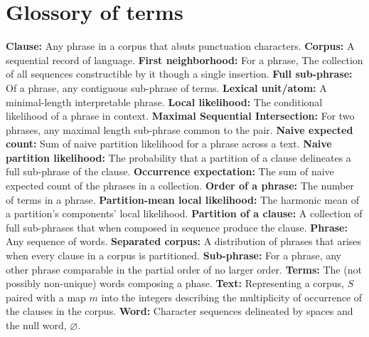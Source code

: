 \section{Glossory of terms}
{\footnotesize
\textbf{Clause:} Any phrase in a corpus that abuts punctuation characters.\newline
\textbf{Corpus:} A sequential record of language.\newline
\textbf{First neighborhood:} For a phrase, The collection of all sequences constructible by it though a single insertion.\newline
\textbf{Full sub-phrase:} Of a phrase, any contiguous sub-phrase of terms.\newline
\textbf{Lexical unit/atom:} A minimal-length interpretable phrase. \newline
\textbf{Local likelihood:} The conditional likelihood of a phrase in context.\newline
\textbf{Maximal Sequential Intersection:} For two phrases, any maximal length sub-phrase common to the pair.\newline
\textbf{Naive expected count:} Sum of naive partition likelihood for a phrase across a text.\newline
\textbf{Naive partition likelihood:} The probability that a partition of a clause delineates a full sub-phrase of the clause.\newline
\textbf{Occurrence expectation:} The sum of naive expected count of the phrases in a collection.\newline
\textbf{Order of a phrase:} The number of terms in a phrase.\newline
\textbf{Partition-mean local likelihood:} The harmonic mean of a partition's components' local likelihood.\newline
\textbf{Partition of a clause:} A collection of full sub-phrases that when composed in sequence produce the clause.\newline
\textbf{Phrase:} Any sequence of words.\newline
\textbf{Separated corpus:} A distribution of phrases that arises when every clause in a corpus is partitioned.\newline
\textbf{Sub-phrase:} For a phrase, any other phrase comparable in the partial order of no larger order.\newline
\textbf{Terms:} The (not possibly non-unique) words composing a phase.\newline
\textbf{Text:} Representing a corpus, $S$ paired with a map $m$ into the integers describing the multiplicity of occurrence of the clauses in the corpus. \newline
\textbf{Word:} Character sequences delineated by spaces and the null word, $\varnothing$.
}




